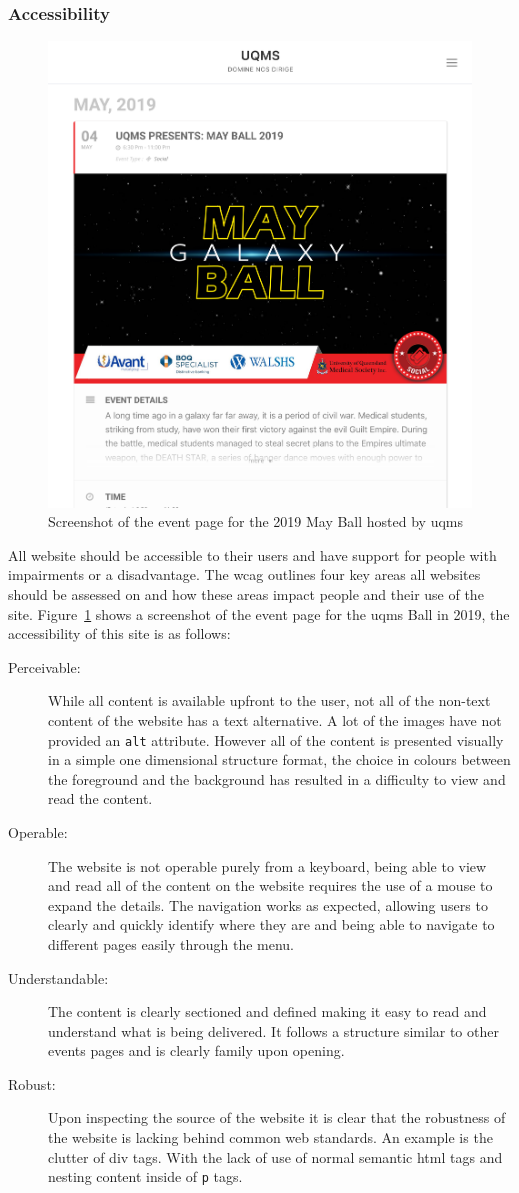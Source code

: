 \subsubsection{Accessibility}
\begin{figure}
	\centering
	\includegraphics[width=0.7\linewidth]{mayball}
	\caption{Screenshot of the event page for the 2019 May Ball hosted by \gls{uqms}}\label{fig:uqms}
\end{figure}
All website should be accessible to their users and have support for people with impairments or a disadvantage. The \gls{wcag} outlines four key areas all websites should be assessed on and how these areas impact people and their use of the site. Figure~\ref{fig:uqms} shows a screenshot of the event page for the \gls{uqms} Ball in 2019, the accessibility of this site is as follows:
\begin{description}
	\item[Perceivable:] While all content is available upfront to the user, not all of the non-text content of the website has a text alternative. A lot of the images have not provided an \texttt{alt} attribute. However all of the content is presented visually in a simple one dimensional structure format, the choice in colours between the foreground and the background has resulted in a difficulty to view and read the content.
	\item[Operable:] The website is not operable purely from a keyboard, being able to view and read all of the content on the website requires the use of a mouse to expand the details. The navigation works as expected, allowing users to clearly and quickly identify where they are and being able to navigate to different pages easily through the menu.
	\item[Understandable:] The content is clearly sectioned and defined making it easy to read and understand what is being delivered. It follows a structure similar to other events pages and is clearly family upon opening.
	\item[Robust:] Upon inspecting the source of the website it is clear that the robustness of the website is lacking behind common web standards. An example is the clutter of div tags. With the lack of use of normal semantic \gls{html} tags and nesting content inside of \texttt{p} tags.
\end{description}
